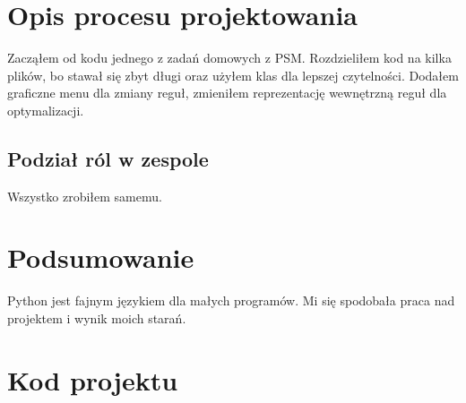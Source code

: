 \documentclass{article}
\begin{document}
\section{Opis procesu projektowania}
Zacząłem od kodu jednego z zadań domowych z PSM. Rozdzieliłem kod na kilka plików,
bo stawał się zbyt długi oraz użyłem klas dla lepszej czytelności. Dodałem graficzne menu
dla zmiany reguł, zmieniłem reprezentację wewnętrzną reguł dla optymalizacji.

\subsection{Podział ról w zespole}
Wszystko zrobiłem samemu.

\section{Podsumowanie}
Python jest fajnym językiem dla małych programów. Mi się spodobała praca nad projektem
i wynik moich starań.

\pagebreak

\section{Kod projektu}




\end{document}
